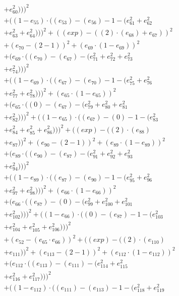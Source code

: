 \documentclass[10pt, a4paper]{article}
\begin{document}
\begin{small}
\begin{align*}
& + e_{60}^{2})))^{2} \\
& + ((1 - e_{55})  \cdot  ((e_{53}) - (e_{56}) - 1 - (e_{61}^{2} + e_{62}^{2} \\
& + e_{63}^{2} + e_{64}^{2})))^{2} + ((exp) - ((2)  \cdot  (e_{68}) + e_{67}))^{2} \\
& + (e_{70} - (2 - 1))^{2} + (e_{69}  \cdot  (1 - e_{69}))^{2} \\
& + (e_{69}  \cdot  ((e_{70}) - (e_{67}) - (e_{71}^{2} + e_{72}^{2} + e_{73}^{2} \\
& + e_{74}^{2})))^{2} \\
& + ((1 - e_{69})  \cdot  ((e_{67}) - (e_{70}) - 1 - (e_{75}^{2} + e_{76}^{2} \\
& + e_{77}^{2} + e_{78}^{2})))^{2} + (e_{65}  \cdot  (1 - e_{65}))^{2} \\
& + (e_{65}  \cdot  ((0) - (e_{67}) - (e_{79}^{2} + e_{80}^{2} + e_{81}^{2} \\
& + e_{82}^{2})))^{2} + ((1 - e_{65})  \cdot  ((e_{67}) - (0) - 1 - (e_{83}^{2} \\
& + e_{84}^{2} + e_{85}^{2} + e_{86}^{2})))^{2} + ((exp) - ((2)  \cdot  (e_{88}) \\
& + e_{87}))^{2} + (e_{90} - (2 - 1))^{2} + (e_{89}  \cdot  (1 - e_{89}))^{2} \\
& + (e_{89}  \cdot  ((e_{90}) - (e_{87}) - (e_{91}^{2} + e_{92}^{2} + e_{93}^{2} \\
& + e_{94}^{2})))^{2} \\
& + ((1 - e_{89})  \cdot  ((e_{87}) - (e_{90}) - 1 - (e_{95}^{2} + e_{96}^{2} \\
& + e_{97}^{2} + e_{98}^{2})))^{2} + (e_{66}  \cdot  (1 - e_{66}))^{2} \\
& + (e_{66}  \cdot  ((e_{87}) - (0) - (e_{99}^{2} + e_{100}^{2} + e_{101}^{2} \\
& + e_{102}^{2})))^{2} + ((1 - e_{66})  \cdot  ((0) - (e_{87}) - 1 - (e_{103}^{2} \\
& + e_{104}^{2} + e_{105}^{2} + e_{106}^{2})))^{2} \\
& + (e_{52} - (e_{65}  \cdot  e_{66}))^{2} + ((exp) - ((2)  \cdot  (e_{110}) \\
& + e_{111}))^{2} + (e_{113} - (2 - 1))^{2} + (e_{112}  \cdot  (1 - e_{112}))^{2} \\
& + (e_{112}  \cdot  ((e_{113}) - (e_{111}) - (e_{114}^{2} + e_{115}^{2} \\
& + e_{116}^{2} + e_{117}^{2})))^{2} \\
& + ((1 - e_{112})  \cdot  ((e_{111}) - (e_{113}) - 1 - (e_{118}^{2} + e_{119}^{2} \\

\end{align*}
\end{small}
\end{document}
